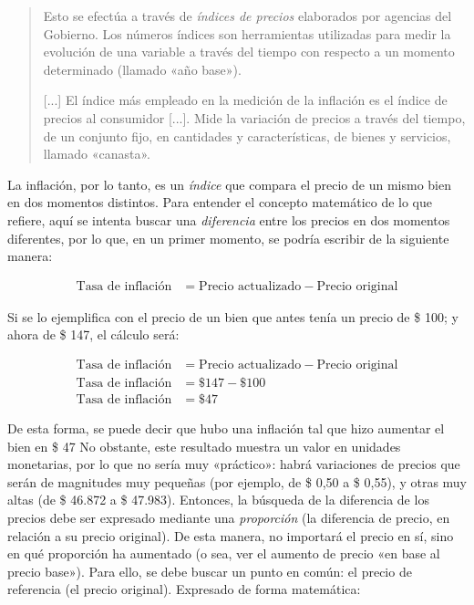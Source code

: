 \documentclass[12pt,a4paper,twoside]{book}
\begin{document}
\begin{quotation}
Esto se efectúa a través de \textit{índices de precios} elaborados por agencias del Gobierno. Los números índices son herramientas utilizadas para medir la evolución de una variable a través del tiempo con respecto a un momento determinado (llamado «año base»).

[...] El índice más empleado en la medición de la inflación es el índice de precios al consumidor [...]. Mide la variación de precios a través del tiempo, de un conjunto fijo, en cantidades y características, de bienes y servicios, llamado «canasta». \cite[págs. 55-56]{nappa:calc-financ}
\end{quotation}

La inflación, por lo tanto, es un \textit{índice} que compara el precio de un mismo bien en dos momentos distintos. Para entender el concepto matemático de lo que refiere, aquí se intenta buscar una \textit{diferencia} entre los precios en dos momentos diferentes, por lo que, en un primer momento, se podría escribir de la siguiente manera:

\begin{align*}
\text{Tasa de inflación} &= \text{Precio actualizado} - \text{Precio original}
\end{align*}

Si se lo ejemplifica con el precio de un bien que antes tenía un precio de \$ 100; y ahora de \$ 147, el cálculo será:

\begin{align*}
\text{Tasa de inflación} &= \text{Precio actualizado} - \text{Precio original} \\
\text{Tasa de inflación} &= \text{\$ } 147 - \text{\$ } 100 \\
\text{Tasa de inflación} &= \text{\$ } 47
\end{align*}

De esta forma, se puede decir que hubo una inflación tal que hizo aumentar el bien en \$ 47 No obstante, este resultado muestra un valor en unidades monetarias, por lo que no sería muy «práctico»: habrá variaciones de precios que serán de magnitudes muy pequeñas (por ejemplo, de \$ 0,50 a \$ 0,55), y otras muy altas (de \$ 46.872 a \$ 47.983). Entonces, la búsqueda de la diferencia de los precios debe ser expresado mediante una \textit{proporción} (la diferencia de precio, en relación a su precio original). De esta manera, no importará el precio en sí, sino en qué proporción ha aumentado (o sea, ver el aumento de precio «en base al precio base»). Para ello, se debe buscar un punto en común: el precio de referencia (el precio original). Expresado de forma matemática:
\end{document}
